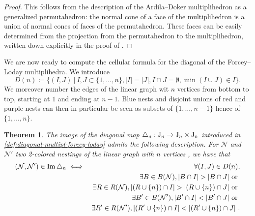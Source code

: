 \documentclass[twoside, 12pt]{amsart}
\newtheorem{theorem}{Theorem}
\theoremstyle{remark}
\begin{document}
\begin{proof} 
This follows from the description of the Ardila--Doker multiplihedron as a generalized permutahedron: 
the normal cone of a face of the multiplihedron is a union of normal cones of faces of the permutahedron. 
These faces can be easily determined from the projection from the permutahedron to the multiplihedron, written down explicitly in the proof of \cite[Theorem 3.3.6]{Doker11}.
\end{proof}

We are now ready to compute the cellular formula for the diagonal of the Forcey--Loday multiplihedra. We introduce \[ D(n)\coloneqq \{(I,J) \ | \ I,J\subset\{1,\ldots,n\}, |I|=|J|, I\cap J=\emptyset, \min(I\cup J)\in I \}. \]
We moreover number the edges of the linear graph wit $n$ vertices from bottom to top, starting at $1$ and ending at $n-1$. Blue nests and disjoint unions of red and purple nests can then in particular be seen as subsets of $\{1,\ldots,n-1\}$ hence of $\{1,\ldots,n\}$.

\begin{theorem}
\label{thm:formuladiagonal}
The image of the diagonal map $\triangle_n : \mathrm{J}_n \to \mathrm{J}_n \times \mathrm{J}_n$ introduced in \cref{def:diagonal-multipl-forcey-loday} admits the following description.
For $\mathcal{N}$ and $\mathcal{N}'$ two 2-colored nestings of the linear graph with $n$ vertices , we have that
\begin{eqnarray*}
  (\mathcal{N},\mathcal{N}') \in \Ima\triangle_n 
  & \iff & \forall (I,J) \in D(n), \\
  && \exists B \in B(\mathcal{N}), |B\cap I|>|B\cap J| \text{ or }  \\
  && \exists R \in R(\mathcal{N}), |(R\cup \{n\}) \cap I|>| (R\cup \{n\}) \cap J| \text{ or }  \\
  && \exists B' \in B(\mathcal{N}'), |B'\cap I|<|B'\cap J| \text{ or } \nonumber \\
  && \exists R' \in R(\mathcal{N}'), |(R'\cup \{n\}) \cap I|<| (R'\cup \{n\}) \cap J| \ .
\end{eqnarray*}
\end{theorem}
\end{document}
